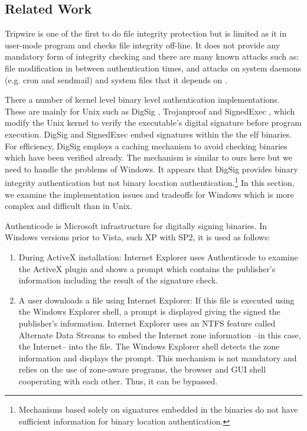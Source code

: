\subsection{Related Work}
\label{sect:related}

Tripwire \cite{kim1994design} is one of the first to do file integrity protection
but is limited as it in user-mode program and 
checks file integrity off-line.
It does not provide any mandatory form of integrity checking and
there are many known attacks such as:
file modification in between authentication times,
and attacks on system daemons (e.g. cron and sendmail)
and system files that it depends on \cite{arnold2001trouble,slaviero2005attacking}.

There a number of kernel level binary level authentication implementations.
These are mainly for Unix
such as DigSig \cite{apvrille2004digsig}, Trojanproof \cite{williams2002anti}
and SignedExec \cite{doorn01signedexecutables}, which modify the Unix kernel
to verify the executable's digital signature before program execution.
DigSig and SignedExec embed signatures within the the elf binaries.
For efficiency, DigSig employs a caching mechanism to avoid checking
binaries which have been verified already. The mechanism is similar 
to ours here but we need to handle the problems of Windows.
It appears that DigSig provides binary integrity authentication
but not binary location authentication.\footnote{Mechanisms based solely on
signatures embedded in the binaries do not have sufficient information
for binary location authentication.}
In this section, we examine the implementation issues and tradeoffs
for Windows which is more complex and difficult than in Unix.

Authenticode \cite{authenticode} is Microsoft infrastructure
for digitally signing binaries.
In Windows versions prior to Vista, such XP with SP2,
it is used as follows:
\begin{enumerate}
\item During ActiveX installation:
Internet Explorer uses Authenticode to examine the ActiveX plugin 
and shows a prompt which contains the publisher's information
including the result of the signature check.
\item A user downloads a file using Internet Explorer:
If this file is executed using the Windows Explorer shell,
a prompt is displayed giving the signed the publisher's information.
Internet Explorer uses an NTFS feature called
Alternate Data Streams to embed the Internet zone information --in this case,
the Internet-- into the file.
The Windows Explorer shell detects the zone information and displays the prompt.
This mechanism is not mandatory and relies on the use of zone-aware programs,
the browser and GUI shell cooperating with each other.
Thus, it can be bypassed.
\end{enumerate}

